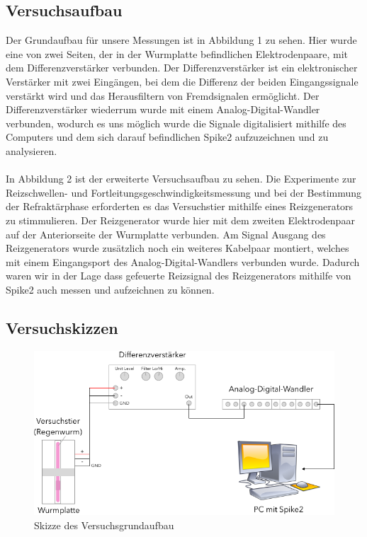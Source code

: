 \documentclass[a4paper]{article}
\begin{document}
\subsection{Versuchsaufbau}
Der Grundaufbau für unsere Messungen ist in Abbildung 1 zu sehen. Hier wurde eine von zwei Seiten, der in der Wurmplatte befindlichen Elektrodenpaare, mit dem Differenzverstärker verbunden. Der Differenzverstärker ist ein elektronischer Verstärker mit zwei Eingängen, bei dem die Differenz der beiden Eingangssignale verstärkt wird und das Herausfiltern von Fremdsignalen ermöglicht. Der Differenzverstärker wiederrum wurde mit einem Analog-Digital-Wandler verbunden, wodurch es uns möglich wurde die Signale digitalisiert mithilfe des Computers und dem sich darauf befindlichen Spike2 aufzuzeichnen und zu analysieren. \\ \\ 
In Abbildung 2 ist der erweiterte Versuchsaufbau zu sehen. Die Experimente zur Reizschwellen- und Fortleitungsgeschwindigkeitsmessung und bei der Bestimmung der Refraktärphase erforderten es das Versuchstier mithilfe eines Reizgenerators zu stimmulieren. Der Reizgenerator wurde hier mit dem zweiten Elektrodenpaar auf der Anteriorseite der Wurmplatte verbunden. Am Signal Ausgang des Reizgenerators wurde zusätzlich noch ein weiteres Kabelpaar montiert, welches mit einem Eingangsport des Analog-Digital-Wandlers verbunden wurde. Dadurch waren wir in der Lage dass gefeuerte Reizsignal des Reizgenerators mithilfe von Spike2 auch messen und aufzeichnen zu können.
\subsection{Versuchskizzen} 
\vspace{2.5\baselineskip}
\begin{figure}[H]
    \centering
    \captionsetup{justification=centering,margin=2cm}
    \includegraphics[scale=0.6]{images/Versuchsaufbau_Wurm.png}
    \caption{Skizze des Versuchsgrundaufbau}
\end{figure}
\end{document}
